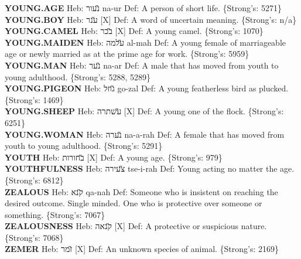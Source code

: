 {\textbf{YOUNG.AGE} Heb: {\large\H נעור} na-ur Def: A person of short life. \{Strong's: 5271\}\hfill{}\\

\textbf{YOUNG.BOY} Heb: {\large\H ענר} {[}X{]} Def: A word of uncertain meaning. \{Strong's: n/a\}\hfill{}\\

\textbf{YOUNG.CAMEL} Heb: {\large\H בכר} {[}X{]} Def: A young camel. \{Strong's: 1070\}\hfill{}\\

\textbf{YOUNG.MAIDEN} Heb: {\large\H עלמה} al-mah Def: A young female of marriageable age or newly married as at the prime age for work. \{Strong's: 5959\}\hfill{}\\

\textbf{YOUNG.MAN} Heb: {\large\H נער} na-ar Def: A male that has moved from youth to young adulthood. \{Strong's: 5288, 5289\}\hfill{}\\

\textbf{YOUNG.PIGEON} Heb: {\large\H גוזל} go-zal Def: A young featherless bird as plucked. \{Strong's: 1469\}\hfill{}\\

\textbf{YOUNG.SHEEP} Heb: {\large\H עשתרה} {[}X{]} Def: A young one of the flock. \{Strong's: 6251\}\hfill{}\\

\textbf{YOUNG.WOMAN} Heb: {\large\H נערה} na-a-rah Def: A female that has moved from youth to young adulthood. \{Strong's: 5291\}\hfill{}\\

\textbf{YOUTH} Heb: {\large\H בחורות} {[}X{]} Def: A young age. \{Strong's: 979\}\hfill{}\\

\textbf{YOUTHFULNESS} Heb: {\large\H צעירה} tse-i-rah Def: Young acting no matter the age. \{Strong's: 6812\}\hfill{}\\

\textbf{ZEALOUS} Heb: {\large\H קנא} qa-nah Def: Someone who is insistent on reaching the desired outcome. Single minded. One who is protective over someone or something. \{Strong's: 7067\}\hfill{}\\

\textbf{ZEALOUSNESS} Heb: {\large\H קנאה} {[}X{]} Def: A protective or suspicious nature. \{Strong's: 7068\}\hfill{}\\

\textbf{ZEMER} Heb: {\large\H זמר} {[}X{]} Def: An unknown species of animal. \{Strong's: 2169\}\hfill{}\\

}
